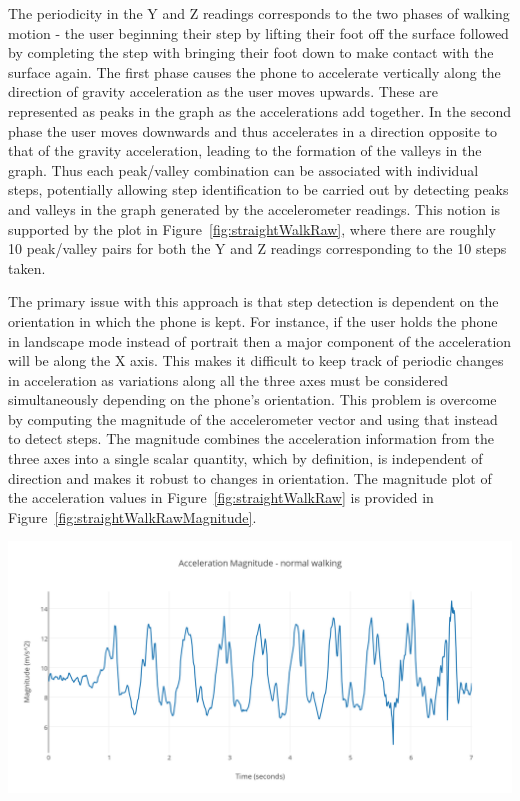 \documentclass[main.tex]{subfiles}
\begin{document}
The periodicity in the Y and Z readings corresponds to the two phases of walking motion - the user beginning their step by lifting their foot off the surface followed by completing the step with bringing their foot down to make contact with the surface again. The first phase causes the phone to accelerate vertically along the direction of gravity acceleration as the user moves upwards. These are represented as peaks in the graph as the accelerations add together. In the second phase the user moves downwards and thus accelerates in a direction opposite to that of the gravity acceleration, leading to the formation of the valleys in the graph. Thus each peak/valley combination can be associated with individual steps, potentially allowing step identification to be carried out by detecting peaks and valleys in the graph generated by the accelerometer readings. This notion is supported by the plot in Figure~\ref{fig:straightWalkRaw}, where there are roughly 10 peak/valley pairs for both the Y and Z readings corresponding to the 10 steps taken.   

The primary issue with this approach is that step detection is dependent on the orientation in which the phone is kept. For instance, if the user holds the phone in landscape mode instead of portrait then a major component of the acceleration will  be along the X axis. This makes it difficult to keep track of periodic changes in acceleration as variations along all the three axes must be considered simultaneously depending on the phone's orientation. This problem is overcome by computing the magnitude of the accelerometer vector and using that instead to detect steps. The magnitude combines the acceleration information from the three axes into a single scalar quantity, which by definition, is independent of direction and makes it robust to changes in orientation. The magnitude plot of the acceleration values in Figure~\ref{fig:straightWalkRaw} is provided in Figure~\ref{fig:straightWalkRawMagnitude}. 

\begin{center}
\includegraphics[scale=0.9]{images/straightWalkRawMagnitude.png}
\label{fig:straightWalkRawMagnitude}
\end{center}
\end{document}
